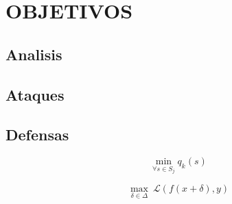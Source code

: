 \chapter{OBJETIVOS}


\section{Analisis}

\section{Ataques}

\section{Defensas}

$$
    \min_{\forall s \in S_j} q_k(s)
$$

$$
    \underset{\delta\in\Delta}{\max} ~\mathcal{L}(f(x+\delta), y)
$$
\thicksim